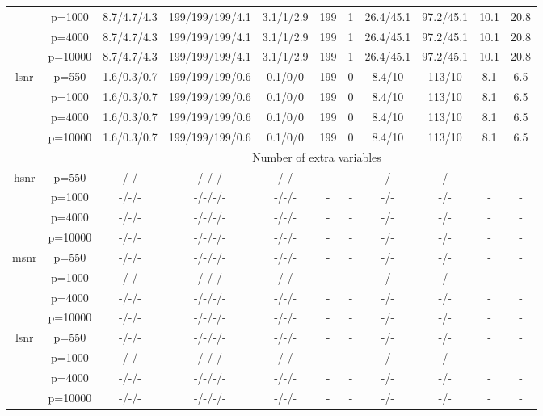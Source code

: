 \begin{table}[ht]
{\begin{tabular}{|c|c|ccccccccc|}
   & p=1000 & 8.7/4.7/4.3 & 199/199/199/4.1 & 3.1/1/2.9 & 199 & 1 & 26.4/45.1 & 97.2/45.1 & 10.1 & 20.8 \\ 
   & p=4000 & 8.7/4.7/4.3 & 199/199/199/4.1 & 3.1/1/2.9 & 199 & 1 & 26.4/45.1 & 97.2/45.1 & 10.1 & 20.8 \\ 
   & p=10000 & 8.7/4.7/4.3 & 199/199/199/4.1 & 3.1/1/2.9 & 199 & 1 & 26.4/45.1 & 97.2/45.1 & 10.1 & 20.8 \\ 
  \midrule\multirow{4}[2]{*}{lsnr} & p=550 & 1.6/0.3/0.7 & 199/199/199/0.6 & 0.1/0/0 & 199 & 0 & 8.4/10 & 113/10 & 8.1 & 6.5 \\ 
   & p=1000 & 1.6/0.3/0.7 & 199/199/199/0.6 & 0.1/0/0 & 199 & 0 & 8.4/10 & 113/10 & 8.1 & 6.5 \\ 
   & p=4000 & 1.6/0.3/0.7 & 199/199/199/0.6 & 0.1/0/0 & 199 & 0 & 8.4/10 & 113/10 & 8.1 & 6.5 \\ 
   & p=10000 & 1.6/0.3/0.7 & 199/199/199/0.6 & 0.1/0/0 & 199 & 0 & 8.4/10 & 113/10 & 8.1 & 6.5 \\ 
   \midrule 
 \multicolumn{1}{|c}{} &       & \multicolumn{9}{c|}{Number of extra variables} \\
\midrule\multirow{4}[2]{*}{hsnr} & p=550 & -/-/- & -/-/-/- & -/-/- & - & - & -/- & -/- & - & - \\ 
   & p=1000 & -/-/- & -/-/-/- & -/-/- & - & - & -/- & -/- & - & - \\ 
   & p=4000 & -/-/- & -/-/-/- & -/-/- & - & - & -/- & -/- & - & - \\ 
   & p=10000 & -/-/- & -/-/-/- & -/-/- & - & - & -/- & -/- & - & - \\ 
  \midrule\multirow{4}[2]{*}{msnr} & p=550 & -/-/- & -/-/-/- & -/-/- & - & - & -/- & -/- & - & - \\ 
   & p=1000 & -/-/- & -/-/-/- & -/-/- & - & - & -/- & -/- & - & - \\ 
   & p=4000 & -/-/- & -/-/-/- & -/-/- & - & - & -/- & -/- & - & - \\ 
   & p=10000 & -/-/- & -/-/-/- & -/-/- & - & - & -/- & -/- & - & - \\ 
  \midrule\multirow{4}[2]{*}{lsnr} & p=550 & -/-/- & -/-/-/- & -/-/- & - & - & -/- & -/- & - & - \\ 
   & p=1000 & -/-/- & -/-/-/- & -/-/- & - & - & -/- & -/- & - & - \\ 
   & p=4000 & -/-/- & -/-/-/- & -/-/- & - & - & -/- & -/- & - & - \\ 
   & p=10000 & -/-/- & -/-/-/- & -/-/- & - & - & -/- & -/- & - & - \\ 
   \bottomrule 
\end{tabular}
}
\end{table}
